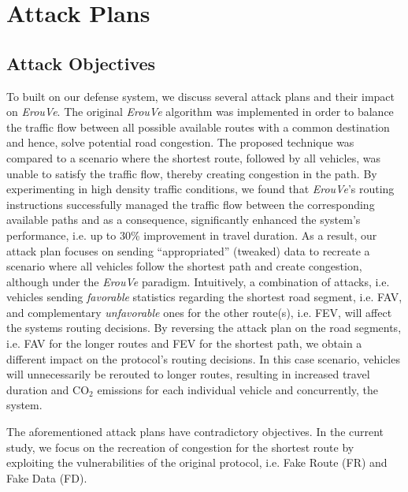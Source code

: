 \documentclass[conference]{IEEEtran}
\begin{document}
\section{Attack Plans}
\label{attack-plan}

\subsection{Attack Objectives}

To built on our defense system, we discuss several attack plans and their impact on {\it ErouVe}. The original {\it ErouVe} algorithm
was implemented in order to balance the traffic flow between all possible available routes with a common destination and hence, solve 
potential road congestion. The proposed technique  was compared to a scenario where the shortest route, followed by all vehicles, 
was unable to satisfy the traffic flow, thereby creating congestion in the path. By experimenting in high density 
traffic conditions, we found that {\it ErouVe}'s routing instructions successfully managed the traffic flow between the 
corresponding available paths and as a consequence, significantly enhanced the system's performance, i.e. up to 30\% improvement in travel duration. 
As a result, our attack plan focuses on sending ``appropriated'' (tweaked) data to recreate a scenario where all vehicles follow the shortest
path and create congestion, although under the {\it ErouVe} paradigm. Intuitively, a combination of attacks, i.e. vehicles 
sending {\it favorable} statistics regarding the shortest road segment, i.e.  FAV, and complementary {\it unfavorable} ones for the other route(s), i.e.  FEV, 
will affect the systems routing decisions. By reversing the attack plan on the road segments, i.e. FAV for the longer routes and FEV for the shortest path, 
we obtain a different impact on the protocol's routing decisions. In this case scenario, vehicles will unnecessarily be rerouted to longer routes, resulting 
in increased travel duration and CO$_2$ emissions for each individual vehicle and concurrently, the system. 


The aforementioned attack plans have contradictory objectives. In the current study, we focus on the recreation of congestion for the shortest route by 
exploiting the vulnerabilities of the original protocol, i.e. Fake Route (FR) and Fake Data (FD).
\end{document}
